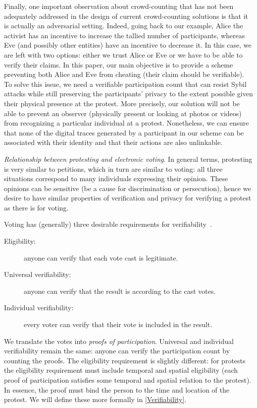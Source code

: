 Finally, one important observation about crowd-counting that has not been adequately addressed in the design of current crowd-counting solutions is that it is actually an adversarial setting. 
Indeed, going back to our example, Alice the activist has an incentive to increase the tallied number of participants, whereas Eve (and possibly other entities) have an incentive to decrease it.
In this case, we are left with two options: either we trust Alice or Eve or we have to be able to verify their claims.
In this paper, our main objective is to provide a scheme preventing both Alice and Eve from cheating (\ie their claim should be verifiable).
To solve this issue, we need a verifiable participation count that can resist Sybil attacks while still preserving the participants'
privacy to the extent possible given their physical presence at the protest. 
More precisely, our solution will not be able to prevent an observer (physically present or looking at photos or videos) from recognizing a particular individual at a protest. 
Nonetheless, we can ensure that none of the digital traces generated by a participant in our scheme can be associated with their identity and that their actions are also unlinkable.

\emph{Relationship between protesting and electronic voting}. In general terms, protesting is very similar to petitions, which in turn are similar to voting: all three situations correspond to many individuals expressing their opinion.
These opinions can be sensitive (\eg be a cause for discrimination or persecution), hence we desire to have similar properties of verification and privacy for verifying a protest as there is for voting.

Voting has (generally) three desirable requirements for verifiability~\cite{VerifyingPrivacyPropertiesOfVotingProtocols}.
\begin{description}
  \item[Eligibility:] anyone can verify that each vote cast is legitimate.
  \item[Universal verifiability:] anyone can verify that the result is according 
    to the cast votes.
  \item[Individual verifiability:] every voter can verify that their vote is 
    included in the result.
\end{description}
We translate the votes into \emph{proofs of participation}.
Universal and individual verifiability remain the same: anyone can verify the participation count by counting the proofs.
The eligibility requirement is slightly different: for protests the eligibility requirement must include temporal and spatial 
eligibility (\ie each proof of participation satisfies some temporal and spatial relation to the protest).
In essence, the proof must bind the person to the time and location of the protest.
We will define these more formally in \cref{Verifiability}.


